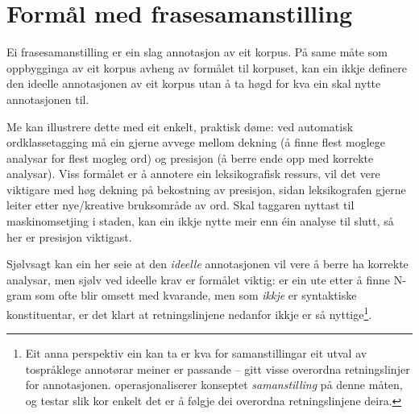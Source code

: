 \documentclass[11pt,a4paper,oneside,draft]{report}
\begin{document}
\section{Formål med frasesamanstilling}
\label{sec-3.2}

\label{SEC:formaal}

Ei frasesamanstilling er ein slag annotasjon av eit korpus. På same
måte som oppbygginga av eit korpus avheng av formålet til korpuset,
kan ein ikkje definere den ideelle annotasjonen av eit korpus utan å
ta høgd for kva ein skal nytte annotasjonen til.

Me kan illustrere dette med eit enkelt, praktisk døme: ved automatisk
ordklassetagging må ein gjerne avvege mellom dekning (å finne flest
moglege analysar for flest mogleg ord) og presisjon (å berre ende opp
med korrekte analysar).  Viss formålet er å annotere ein
leksikografisk ressurs, vil det vere viktigare med høg dekning på
bekostning av presisjon, sidan leksikografen gjerne leiter etter
nye/kreative bruksområde av ord. Skal taggaren nyttast til
maskinomsetjing i staden, kan ein ikkje nytte meir enn éin analyse til
slutt, så her er presisjon viktigast.

Sjølvsagt kan ein her seie at den \emph{ideelle} annotasjonen vil vere å
berre ha korrekte analysar, men sjølv ved ideelle krav er formålet
viktig: er ein ute etter å finne N-gram som ofte blir omsett med
kvarande, men som \emph{ikkje} er syntaktiske konstituentar, er det klart
at retningslinjene nedanfor ikkje er så nyttige\footnote{Eit anna perspektiv ein kan ta er kva for samanstillingar eit
        utval av tospråklege annotørar meiner er passande -- gitt
        visse overordna retningslinjer for
        annotasjonen. \citet{volk2008hjp} operasjonaliserer konseptet
        \emph{samanstilling} på denne måten, og testar slik kor enkelt det
        er å følgje dei overordna retningslinjene deira. }.
\end{document}

